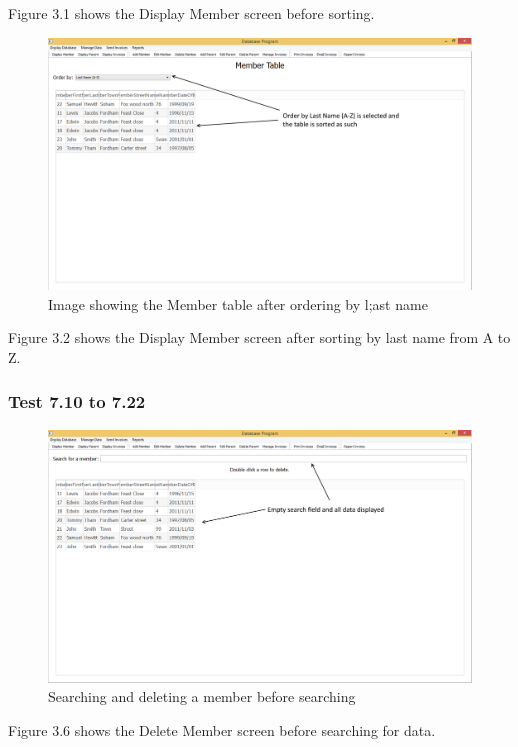 Figure 3.1 shows the Display Member screen before sorting.

\begin{figure}[H]
\includegraphics[width=\textwidth]{./Testing/Images/DisplayMember2.png}
    \caption{Image showing the Member table after ordering by l;ast name} \label{fig:display_member_2}
\end{figure}

Figure 3.2 shows the Display Member screen after sorting by last name from A to Z.


\subsubsection{Test 7.10 to 7.22} 
\begin{figure}[H]
\includegraphics[width=\textwidth]{./Testing/Images/DeleteMember1.png}
    \caption{Searching and deleting a member before searching} \label{fig:delete_member_1}
\end{figure}

Figure 3.6 shows the Delete Member screen before searching for data.

